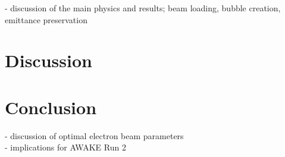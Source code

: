 \documentclass[aps,prstab,reprint,groupedaddress]{revtex4-1}
\begin{document}
- discussion of the main physics and results; beam loading, bubble creation, emittance preservation \\

\section[\label{S:D}]{Discussion}
\section[\label{S:C}]{Conclusion}

- discussion of optimal electron beam parameters \\
- implications for AWAKE Run 2 \\



\end{document}
